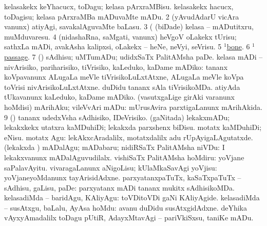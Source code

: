 \noindent
\gl{\pagu}
\expl{}
\bmng
\bnum
{}  
\banum
{} kelasakekx keYhacucx, toDagu; kelasa pArxraMBisu. 
 kelasakekx hacucx, toDagisu; kelasa pArxraMBa mADuvaMte mADu. 
\eanum
\numie
\num{2}  (yAvudAdarU vicAra \mo vanunx) atiyAgi, savakalAguvaMte baLasu. 
\num{3}  (  (biDade) kelasa -- mADutitxru, muMduvaresu. 
\num{4}  (nidashaRna, saMgati, \mo vanunx) heVgoV oLakekx tUrisu; sathxLa mADi, avakAsha kalipxsi, oLakekx -- heNe, neVyi, seVrisu. 
\num{5}  \hyperref{kandict_b.pdf}{B}{bone(1) nuga(13)}{$^1$bone}. 
\num{6}  \hyperref{kandict_p.pdf}{P}{passage(1) pagu(2)}{$^1$passage}. 
\num{7}  (\AmA) sAdhisu; uMTumADu; udidxSaTx PalitAMsha paDe. 
  
\banum
{} kelasa mADi -- nivArisiko, pariharisiko, tiVrisiko, kaLeduko, kaDame mADiko:  tananx koVpavanunx ALugaLa meVle tiVrisikoLuLxtAtxne, ALugaLa meVle koVpa toVrisi nivArisikoLuLxtAtxne.  duDidu tananx sAla tiVrisikoMDa.  atiyAda tUkavanunx kaLeduko, kaDame mADiko. 
 (vasutxgaLige girAki \mo varanunx hoMdisi) mArihAku; vileVvAri mADu:    mUrusAvira parxtigaLanunx mArihAkida. 
\eanum
\numie
\num{9}  (\AmA) tananx udedxVsha sAdhisiko, IDeVrisiko. 
  
\banum
{} (gaNitada) lekakxmADu; lekakxkekx utatxra kaMDuhiDi; lekakxda parxshenx biDisu. 
 motatx kaMDuhiDi; eNisu. 
 motatx Agu:  lekAkxcAradalilx, motatxdalilx adu  rUpAyigaLAgutatxde. 
 (lekakxda \vi) mADalAgu; mADabaru; nidiRSaTx PalitAMsha niVDu:  I lekakxvanunx mADalAguvudilalx. 
 vishiSaTx PalitAMsha hoMdiru:  yoVjane saPalavAyitu. 
 vivaragaLanunx aNigoLisu; kUlaMkaSavAgi yoVjisu:  yoVjaneyoMdanunx tayArisidAdxne. 
 parxyatanxpaTuTx, kaSaTxpaTuTx -- sAdhisu, gaLisu, paDe:  parxyatanx mADi tananx mukitx sAdhisikoMDa. 
 kelasadiMda -- baridAgu, KAliyAgu:  toVDitoVDi gaNi KAliyAgide. 
 kelasadiMda -- susAtxgu, baLalu, AyAsa hoMdu:  avanu duDidu susAtxgidAdxne. 
 deYhika vAyxyAmadalilx toDagu 
\eanum
\numie
{}  
\banum
{} pUtiR, AdayxMtavAgi -- pariVkiSxsu, taniKe mADu. 
